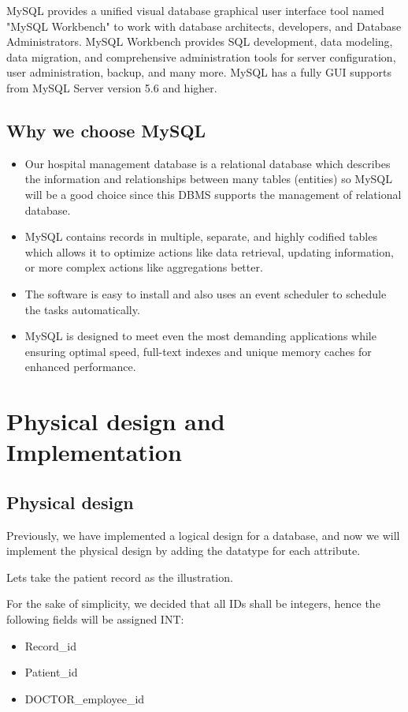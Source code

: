 \documentclass[a4paper]{article}
\numberwithin{equation}{section}
\begin{document}
MySQL provides a unified visual database graphical user interface tool named  "MySQL Workbench" to work with database architects, developers, and Database Administrators. MySQL Workbench provides SQL development, data modeling, data migration, and comprehensive administration tools for server configuration, user administration, backup, and many more. MySQL has a fully GUI supports from MySQL Server version 5.6 and higher.


\subsection{Why we choose MySQL}
\begin{itemize}
  \item Our hospital management database is a relational database which describes the information and relationships between many tables (entities) so MySQL will be a good choice since this DBMS supports the management of relational database.
  \item MySQL contains records in multiple, separate, and highly codified tables which allows it to optimize actions like data retrieval, updating information, or more complex actions like aggregations better.
  \item The software is easy to install and also uses an event scheduler to schedule the tasks automatically.
  \item MySQL is designed to meet even the most demanding applications while ensuring optimal speed, full-text indexes and unique memory caches for enhanced performance.
\end{itemize}

\newpage

\section{Physical design and Implementation}
\subsection{Physical design}
Previously, we have implemented a logical design for a database, and now we will implement the physical design by adding the datatype for each attribute.

Lets take the patient record as the illustration.

For the sake of simplicity, we decided that all IDs shall be integers, hence the following fields will be assigned INT:
\begin{itemize}
    \item Record\_id
    \item Patient\_id
    \item DOCTOR\_employee\_id
\end{itemize}
\end{document}

